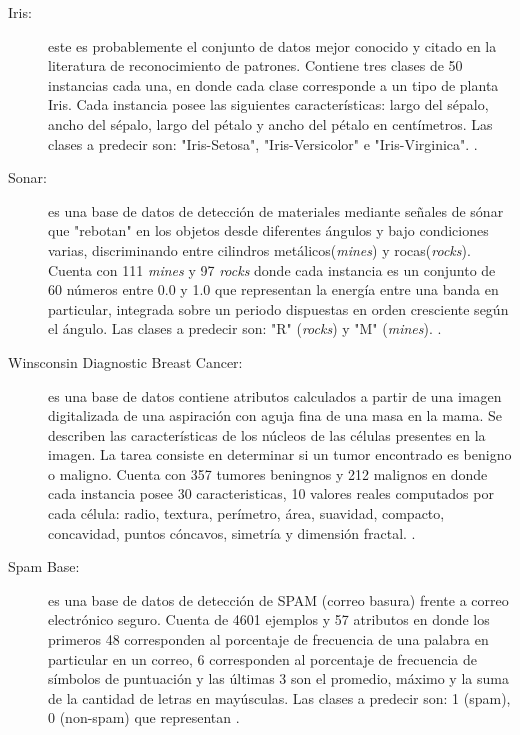 \documentclass{ci5652}
\begin{document}
\begin{description}
  \item [Iris:] este es probablemente el conjunto de datos mejor conocido y citado
  en la literatura de reconocimiento de patrones. Contiene tres clases de 50
  instancias cada una, en donde cada clase corresponde a un tipo de planta Iris.
  Cada instancia posee las siguientes características: largo del sépalo, ancho 
  del sépalo, largo del pétalo y ancho del pétalo en centímetros. Las clases a
  predecir son: "Iris-Setosa", "Iris-Versicolor" e "Iris-Virginica". 
  \cite{UCI_Iris}.
  
  \item [Sonar:] es una base de datos de detección de materiales mediante señales 
  de sónar que "rebotan" en los objetos desde diferentes ángulos y bajo 
  condiciones varias, discriminando entre cilindros metálicos(\textit{mines}) y
  rocas(\textit{rocks}). Cuenta con 111 \textit{mines} y 97 \textit{rocks} donde
  cada instancia es un conjunto de 60 números entre 0.0 y 1.0 que representan la
  energía entre una banda en particular, integrada sobre un periodo dispuestas 
  en orden cresciente según el ángulo. Las clases a predecir son: "R"
  (\textit{rocks}) y "M" (\textit{mines}). \cite{UCI_Sonar}.
   
  \item [Winsconsin Diagnostic Breast Cancer:] es una base de datos contiene
  atributos calculados a partir de una imagen digitalizada de una aspiración con
  aguja fina de una masa en la mama. Se describen las características de los
  núcleos de las células presentes en la imagen. La tarea consiste en determinar
  si un tumor encontrado es benigno o maligno. Cuenta con 357 tumores beningnos
  y 212 malignos en donde cada instancia posee 30 caracteristicas, 10 valores
  reales computados por cada célula: radio, textura, perímetro, área, suavidad,
  compacto, concavidad, puntos cóncavos, simetría y dimensión fractal.
  \cite{UCI_WDBC}.

  \item [Spam Base:] es una base de datos de detección de SPAM (correo basura)
  frente a correo electrónico seguro. Cuenta de 4601 ejemplos y 57 atributos en
  donde los primeros 48 corresponden al porcentaje de frecuencia de una palabra
  en particular en un correo, 6 corresponden al porcentaje de frecuencia de
  símbolos de puntuación y las últimas 3 son el promedio, máximo y la suma de la
  cantidad de letras en mayúsculas. Las clases a predecir son: 1 (spam), 0 
  (non-spam) que representan \cite{UCI_SpamBase}.
  
\end{description}
\end{document}
